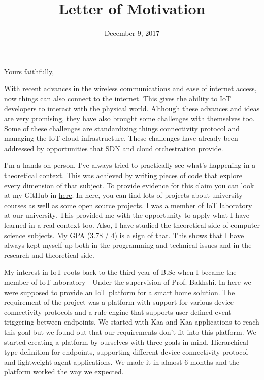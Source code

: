 \documentclass[11pt,a4paper,sans]{moderncv}        %
\title{Letter of Motivation}                               %
\begin{document}
\date{December 9, 2017}
\opening{}
\closing{Yours faithfully,}

\makelettertitle


With recent advances in the wireless communications and ease of internet access,
now things can also connect to the internet. This gives the ability to IoT
developers to interact with the physical world. Although these advances and ideas
are very promising, they have also brought some challenges with themselves too.
Some of these challenges are standardizing things connectivity protocol and
managing the IoT cloud infrastructure. These challenges have already been addressed by
opportunities that SDN and cloud orchestration provide.

I'm a hands-on person. I've always tried to practically see what's happening
in a theoretical context. This was achieved by writing pieces of code that explore
every dimension of that subject. To provide evidence for this claim you can
look at my GitHub in \href{https://github.com/Tabrizian}{here}. In
here, you can find lots of projects about university courses as well as some
open source projects. I was a member of IoT laboratory at our university. This
provided me with the opportunity to apply what I have learned in a real context too.
Also, I have studied the theoretical side of computer science subjects.
My GPA (3.78 / 4) is a sign of that. This shows that I have always kept
myself up both in the programming and technical issues and in the research and
theoretical side.

My interest in IoT roots back to the third year of B.Sc when I became the member
of IoT laboratory - Under the supervision of Prof. Bakhshi.
In here we were supposed to provide an IoT platform for
a smart home solution. The requirement of the project was a platform with
support for various device connectivity protocols and a rule engine that
supports user-defined event triggering between endpoints. We started with Kaa
and Kaa applications to reach this goal but we found out that our requirements
don't fit into this platform. We started creating a platform by ourselves
with three goals in mind. Hierarchical type definition for endpoints,
supporting different device connectivity protocol and lightweight
agent applications. We made it in almost 6 months and the platform worked the
way we expected.
\end{document}
